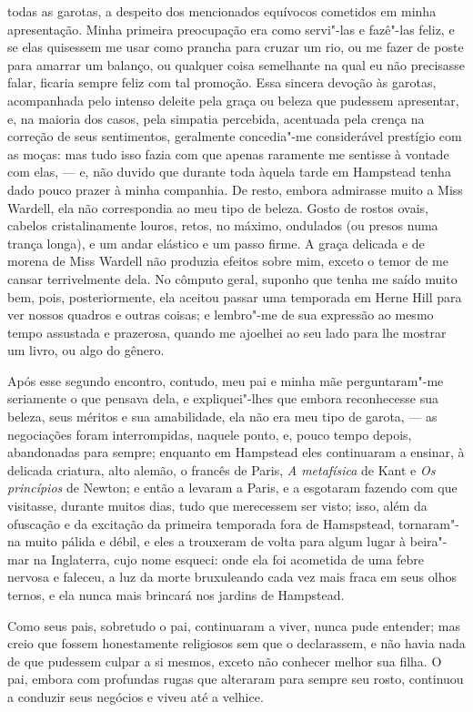 todas as garotas, a despeito dos mencionados equívocos cometidos em
minha apresentação. Minha primeira preocupação era como servi"-las
e fazê"-las feliz, e se elas quisessem me usar como prancha para cruzar
um rio, ou me fazer de poste para amarrar um balanço, ou qualquer coisa
semelhante na qual eu não precisasse falar, ficaria sempre feliz com tal
promoção. Essa sincera devoção às garotas, acompanhada pelo intenso
deleite pela graça ou beleza que pudessem apresentar, e, na maioria dos
casos, pela simpatia percebida, acentuada pela crença na correção de
seus sentimentos, geralmente concedia"-me considerável prestígio com as
moças: mas tudo isso fazia com que apenas raramente me sentisse à
vontade com elas, --- e, não duvido que durante toda àquela tarde em
Hampstead tenha dado pouco prazer à minha companhia. De resto, embora
admirasse muito a Miss Wardell, ela não correspondia ao meu tipo de
beleza. Gosto de rostos ovais, cabelos cristalinamente louros, retos, no
máximo, ondulados (ou presos numa trança longa), e um andar elástico e
um passo firme. A graça delicada e de morena de Miss Wardell não
produzia efeitos sobre mim, exceto o temor de me cansar terrivelmente
dela. No cômputo geral, suponho que tenha me saído muito bem, pois,
posteriormente, ela aceitou passar uma temporada em Herne Hill para ver
nossos quadros e outras coisas; e lembro"-me de sua expressão ao mesmo
tempo assustada e prazerosa, quando me ajoelhei ao seu lado para lhe
mostrar um livro, ou algo do gênero.

Após esse segundo encontro, contudo, meu pai e minha mãe
perguntaram"-me seriamente o que pensava dela, e expliquei"-lhes que
embora reconhecesse sua beleza, seus méritos e sua amabilidade, ela não
era meu tipo de garota, --- as negociações foram interrompidas, naquele
ponto, e, pouco tempo depois, abandonadas para sempre; enquanto em
Hampstead eles continuaram a ensinar, à delicada criatura, alto alemão,
o francês de Paris, \textit{A metafísica} de Kant e \textit{Os princípios} de Newton; e então a levaram a Paris, e a esgotaram
fazendo com que visitasse, durante muitos dias, tudo que merecessem ser
visto; isso, além da ofuscação e da excitação da primeira temporada fora
de Hamspstead, tornaram"-na muito pálida e débil, e eles a trouxeram de
volta para algum lugar à beira"-mar na Inglaterra, cujo nome esqueci:
onde ela foi acometida de uma febre nervosa e faleceu, a luz da morte
bruxuleando cada vez mais fraca em seus olhos ternos, e ela nunca mais
brincará nos jardins de Hampstead.

Como seus pais, sobretudo o pai, continuaram a viver, nunca pude
entender; mas creio que fossem honestamente religiosos sem que o
declarassem, e não havia nada de que pudessem culpar a si mesmos, exceto
não conhecer melhor sua filha. O pai, embora com profundas rugas que
alteraram para sempre seu rosto, continuou a conduzir seus negócios e
viveu até a velhice.

